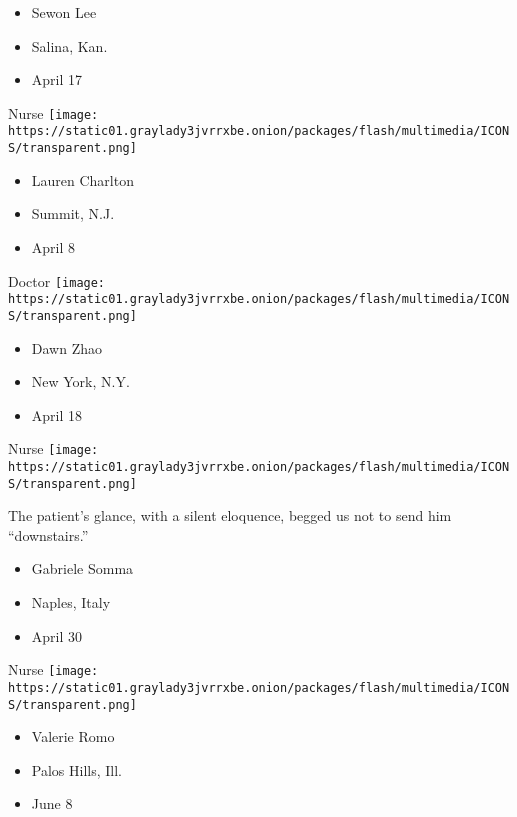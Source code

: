 \begin{itemize}
\tightlist
\item
  Sewon Lee
\item
  Salina, Kan.
\item
  April 17
\end{itemize}

\protect\hyperlink{item-lauren-charlton}{}

Nurse
\texttt{[image: https://static01.graylady3jvrrxbe.onion/packages/flash/multimedia/ICONS/transparent.png]}

\begin{itemize}
\tightlist
\item
  Lauren Charlton
\item
  Summit, N.J.
\item
  April 8
\end{itemize}

\protect\hyperlink{item-dawn-zhao}{}

Doctor
\texttt{[image: https://static01.graylady3jvrrxbe.onion/packages/flash/multimedia/ICONS/transparent.png]}

\begin{itemize}
\tightlist
\item
  Dawn Zhao
\item
  New York, N.Y.
\item
  April 18
\end{itemize}

\protect\hyperlink{item-gabriele-somma}{}

Nurse
\texttt{[image: https://static01.graylady3jvrrxbe.onion/packages/flash/multimedia/ICONS/transparent.png]}

The patient's glance, with a silent eloquence, begged us not to send him
``downstairs.''

\begin{itemize}
\tightlist
\item
  Gabriele Somma
\item
  Naples, Italy
\item
  April 30
\end{itemize}

\protect\hyperlink{item-valerie-romo}{}

Nurse
\texttt{[image: https://static01.graylady3jvrrxbe.onion/packages/flash/multimedia/ICONS/transparent.png]}

\begin{itemize}
\tightlist
\item
  Valerie Romo
\item
  Palos Hills, Ill.
\item
  June 8
\end{itemize}

